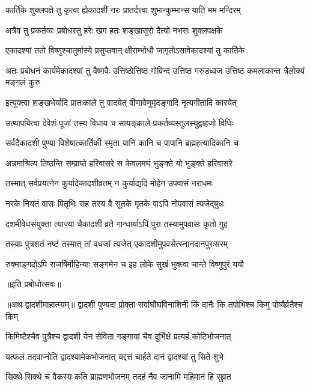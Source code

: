 \twolineshloka
{कार्तिके शुक्लपक्षे तु कृत्वा ह्येकादशीं नरः}
{प्रातर्दत्त्वा शुभान्कुम्भान्स याति मम मन्दिरम्} %

\twolineshloka
{अत्रैव तु प्रकर्तव्यः प्रबोधस्तु हरेः खग}
{हतः शङ्खासुरो दैत्यो नभसः शुक्लपक्षके} %

\twolineshloka
{एकादश्यां ततो विष्णुश्चातुर्मास्ये प्रसुप्तवान्}
{क्षीराम्भोधौ जागृतोऽसावेकादश्यां तु कार्तिके} %

\threelineshloka
{अतः प्रबोधनं कार्यमेकादश्यां तु वैष्णवैः}
{उत्तिष्ठोत्तिष्ठ गोविन्द उत्तिष्ठ गरुडध्वज}
{उत्तिष्ठ कमलाकान्त त्रैलोक्यं मङ्गलं कुरु} %

\twolineshloka
{इत्युक्त्वा शङ्खभेर्यादि प्रातःकाले तु वादयेत्}
{वीणावेणुमृदङ्गादि नृत्यगीतादि कारयेत्} %

\twolineshloka
{उत्थापयित्वा देवेशं पूजां तस्य विधाय च}
{सायङ्काले प्रकर्तव्यस्तुलस्युद्वाहजो विधिः} %

\twolineshloka
{सर्वदैकादशी पुण्या विशेषात्कार्तिकी स्मृता}
{यानि कानि च पापानि ब्रह्महत्यादिकानि च} %

\twolineshloka
{अन्नमाश्रित्य तिष्ठन्ति सम्प्राप्ते हरिवासरे}
{स केवलमघं भुङ्क्ते यो भुङ्क्ते हरिवासरे} %

\twolineshloka
{तस्मात् सर्वप्रयत्नेन कुर्यादेकादशीव्रतम्}
{न कुर्याद्यदि मोहेन उपवासं नराधमः} %

\twolineshloka
{नरके नियतं वासः पितृभिः सह तस्य वै}
{सूतके मृतके वाऽपि नोपवासं त्यजेद्बुधः} %

\twolineshloka
{दशमीवेधसंयुक्ता त्याज्या चैकादशी व्रते}
{गान्धार्याऽपि पुरा तस्यामुपवासः कृतो गुह} %

\twolineshloka
{तस्याः पुत्रशतं नष्टं तस्मात् तां वधजां त्यजेत्}
{एकादशीमुपवसेत्स्नानदानपुरःसरम्} %

\twolineshloka
{रुक्माङ्गदोऽपि राजर्षिर्मोहिन्याः सङ्गमेन च}
{इह लोके सुखं भुक्त्वा चान्ते विष्णुपुरं ययौ} %


॥इति प्रबोधोत्सवः॥

॥अथ द्वादशीमाहात्म्यम्॥
\twolineshloka
{द्वादशी पुण्यदा प्रोक्ता सर्वाघौघविनाशिनी}
{किं दानैः कि तपोभिश्च किमु पोष्यैर्व्रतैश्च किम्} %

\twolineshloka
{किमिष्टैश्चैव पुत्रैश्च द्वादशी येन सेविता}
{गङ्गायां चैव दुर्भिक्षे प्रत्यहं कोटिभोजनात्} %

\twolineshloka
{यत्फलं तदवाप्नोति द्वादश्यामेकभोजनात्}
{यद्दत्तं चार्हते दानं द्वादश्यां तु सिते शुभे} %

\twolineshloka
{सिक्थे सिक्थे च वैकस्य कति ब्राह्मणभोजनम्}
{तदहं नैव जानामि महिमानं हि सुव्रत} %


